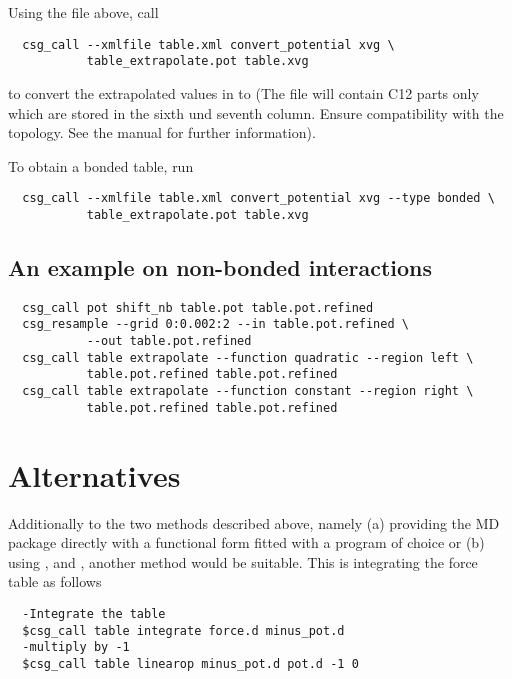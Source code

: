 Using the  file above, call
\begin{verbatim}
  csg_call --xmlfile table.xml convert_potential xvg \
           table_extrapolate.pot table.xvg
\end{verbatim}
to convert the extrapolated values in  to  (The file will contain \gromacs C12 parts only which are stored in the sixth und seventh column. Ensure compatibility with the \gromacs topology. See the \gromacs manual for further information).

To obtain a bonded table, run
\begin{verbatim}
  csg_call --xmlfile table.xml convert_potential xvg --type bonded \
           table_extrapolate.pot table.xvg
\end{verbatim}

\subsection*{An example on non-bonded interactions}
\begin{verbatim}
  csg_call pot shift_nb table.pot table.pot.refined
  csg_resample --grid 0:0.002:2 --in table.pot.refined \
           --out table.pot.refined
  csg_call table extrapolate --function quadratic --region left \
           table.pot.refined table.pot.refined
  csg_call table extrapolate --function constant --region right \
           table.pot.refined table.pot.refined
\end{verbatim}


\section{Alternatives}
Additionally to the two methods described above, namely (a) providing the MD package directly with a functional form fitted with a program of choice or (b) using ,  and , another method would be suitable. This is integrating the force table as follows
\begin{verbatim}
  -Integrate the table
  $csg_call table integrate force.d minus_pot.d
  -multiply by -1
  $csg_call table linearop minus_pot.d pot.d -1 0
\end{verbatim}